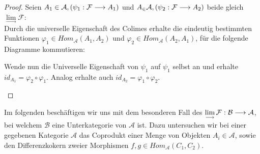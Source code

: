 \documentclass[10pt,a4paper]{report}
\newcommand{\comment}[1]{}
\newcommand{\functionfront}[3]{\nolinebreak{#1:#2 \longrightarrow #3}}
\newcommand{\colimes}[0]{\lim\limits_{ \longrightarrow }}
\begin{document}
\begin{proof}
Seien $A_1 \in \mathcal{A}, (\functionfront{\psi_1}{\mathcal{F}}{A_1}) $ und $A_ \in \mathcal{A} , (\functionfront{\psi_2}{\mathcal{F}}{A_2}) $ beide gleich $\colimes \mathcal{F}$:\\
Durch die universelle Eigenschaft des Colimes erhalte die eindeutig bestimmten Funktionen $\varphi_1 \in Hom_{\mathcal{A}}(A_1,A_2)$ und $\varphi_2 \in Hom_{\mathcal{A}}(A_2,A_1)$, für die folgende Diagramme kommutieren:

\comment{$\functionfront{\varphi_1}{\mathcal{A}_1}{\mathcal{A}_2}$ und $\functionfront{\varphi_2}{\mathcal{A}_2}{\mathcal{A}_1}$}
\begin{center}
\end{center}
\begin{flushleft}
Wende nun die Universelle Eigenschaft von $\psi_1$ auf $\psi_1$ selbst an und erhalte $id_{A_1} = \varphi_2 \circ \varphi_1$. Analog erhalte auch $id_{A_2} = \varphi_1 \circ \varphi_2$.
\end{flushleft}
\begin{center}
\end{center}
\end{proof}
Im folgenden beschäftigen wir uns mit dem besonderen Fall des $\colimes \functionfront{\mathcal{F}}{\mathcal{B}}{\mathcal{A}}$, bei welchem $\mathcal{B}$ eine Unterkategorie von $\mathcal{A}$ ist. Dazu untersuchen wir bei einer gegebenen Kategorie $\mathcal{A}$ das Coprodukt einer Menge von Objekten $A_i \in \mathcal{A}$, sowie den Differenzkokern zweier Morphismen $f,g \in Hom_{\mathcal{A}}(C_1,C_2)$.
\end{document}

